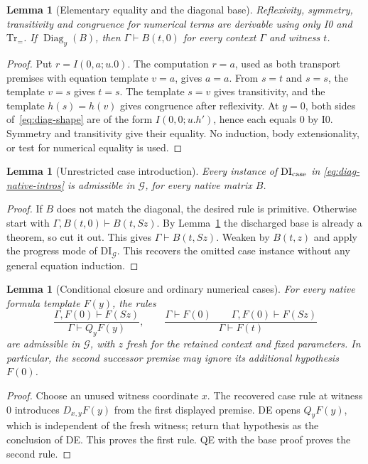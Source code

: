 \documentclass[11pt]{article}
\newtheorem{lemma}[theorem]{Lemma}
\theoremstyle{definition}
\theoremstyle{remark}
\begin{document}
\begin{lemma}[Elementary equality and the diagonal base]
\label{lem:diag-base}
Reflexivity, symmetry, transitivity and congruence for numerical terms are
derivable using only I0 and $\mathrm{Tr}_{=}$.  If
$\operatorname{Diag}_y(B)$, then $\Gamma\vdash B(t,0)$ for every
context $\Gamma$ and witness $t$.
\end{lemma}
\begin{proof}
Put $r=I(0,a;u.0)$.  The computation $r=a$, used as both transport
premises with equation template $v=a$, gives $a=a$.
From $s=t$ and $s=s$, the template $v=s$ gives $t=s$.
The template $s=v$ gives transitivity, and the template
$h(s)=h(v)$ gives congruence after reflexivity.
At $y=0$, both sides of~\eqref{eq:diag-shape} are of the form
$I(0,0;u.h')$, hence each equals $0$ by I0.
Symmetry and transitivity give their equality.  No induction, body
extensionality, or test for numerical equality is used.
\end{proof}

\begin{lemma}[Unrestricted case introduction]
\label{lem:diag-all-cases}
Every instance of $\mathrm{DI}_{\rm case}$ in
\eqref{eq:diag-native-intros} is admissible in $\mathcal G$, for every
native matrix $B$.
\end{lemma}
\begin{proof}
If $B$ does not match the diagonal, the desired rule is primitive.
Otherwise start with
$\Gamma,B(t,0)\vdash B(t,Sz)$.
By Lemma~\ref{lem:diag-base} the discharged base is already a theorem,
so cut it out.  This gives $\Gamma\vdash B(t,Sz)$.
Weaken by $B(t,z)$ and apply the progress mode of
$\mathrm{DI}_{\mathcal G}$.
This recovers the omitted case instance without any general equation
induction.
\end{proof}

\begin{lemma}[Conditional closure and ordinary numerical cases]
\label{lem:diag-case-interface}
For every native formula template $F(y)$, the rules
\[
 \frac{\Gamma,F(0)\vdash F(Sz)}{\Gamma\vdash Q_yF(y)},
 \qquad
 \frac{\Gamma\vdash F(0)\qquad\Gamma,F(0)\vdash F(Sz)}
      {\Gamma\vdash F(t)}
\]
are admissible in $\mathcal G$, with $z$ fresh for the retained
context and fixed parameters.  In particular, the second successor
premise may ignore its additional hypothesis $F(0)$.
\end{lemma}
\begin{proof}
Choose an unused witness coordinate $x$.  The recovered case rule at
witness $0$ introduces $D_{x,y}F(y)$ from the first displayed premise.
DE opens $Q_yF(y)$, which is independent of the fresh witness; return
that hypothesis as the conclusion of DE.  This proves the first rule.
QE with the base proof proves the second rule.
\end{proof}
\end{document}

